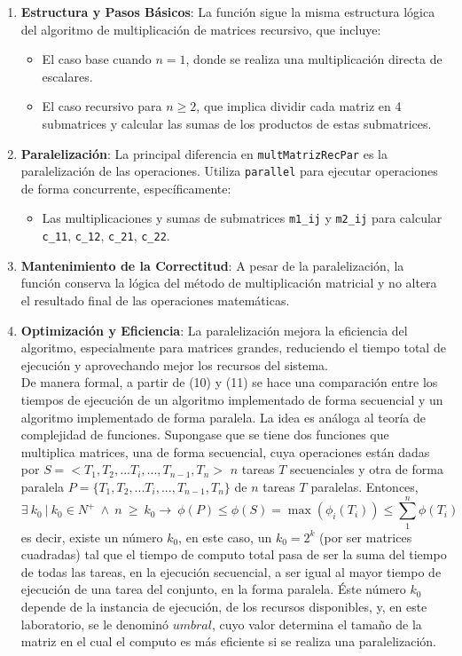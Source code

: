 \documentclass[12pt, a4paper]{article}
\begin{document}
\begin{enumerate}
    \item \textbf{Estructura y Pasos Básicos}: La función sigue la misma estructura lógica del algoritmo de multiplicación de matrices recursivo, que incluye:
    \begin{itemize}
        \item El caso base cuando $n = 1$, donde se realiza una multiplicación directa de escalares.
        \item El caso recursivo para $n \geq 2$, que implica dividir cada matriz en 4 submatrices y calcular las sumas de los productos de estas submatrices.
    \end{itemize}
    
    \item \textbf{Paralelización}: La principal diferencia en \texttt{multMatrizRecPar} es la paralelización de las operaciones. Utiliza \texttt{parallel} para ejecutar operaciones de forma concurrente, específicamente:
    \begin{itemize}
        \item Las multiplicaciones y sumas de submatrices \texttt{m1\_ij} y \texttt{m2\_ij} para calcular \texttt{c\_11}, \texttt{c\_12}, \texttt{c\_21}, \texttt{c\_22}.
    \end{itemize}

    \item \textbf{Mantenimiento de la Correctitud}: A pesar de la paralelización, la función conserva la lógica del método de multiplicación matricial y no altera el resultado final de las operaciones matemáticas.

    \item \textbf{Optimización y Eficiencia}: La paralelización mejora la eficiencia del algoritmo, especialmente para matrices grandes, reduciendo el tiempo total de ejecución y aprovechando mejor los recursos del sistema.
    \\ De manera formal, a partir de (10) y (11) se hace una comparación entre los tiempos de ejecución de un algoritmo implementado de forma secuencial y un algoritmo implementado de forma paralela.
     La idea es análoga al teoría de complejidad de funciones. Supongase que se tiene dos funciones que multiplica matrices, una de forma secuencial, cuya operaciones están dadas por 
     $S=<T_1,T_2,...T_i,...,T_{n-1},T_{n}>$ $n$ tareas $T$ secuenciales y otra de forma paralela $P=\{T_1,T_2,...T_i,...,T_{n-1},T_{n}\}$  de $n$ tareas $T$ paralelas. Entonces, 
    \[
     \exists~k_0~|~k_0 \in N^+~\land~n~\geq~k_0 \rightarrow ~\phi(P) \leq \phi(S) = \max (\phi_i(T_i)) \leq \sum_{1}^{n}\phi(T_i)   
    \]
    es decir, existe un número $k_0$, en este caso, un $k_0 = 2^k$ (por ser matrices cuadradas) tal que el tiempo de computo total pasa de ser la suma del tiempo de todas las tareas, en la ejecución secuencial, a
    ser igual al mayor tiempo de ejecución de una tarea del conjunto, en la forma paralela. Éste número $k_0$ depende de la instancia de ejecución, de los recursos disponibles, y, en este laboratorio, se le denominó
    $umbral$, cuyo valor determina el tamaño de la matriz en el cual el computo es más eficiente si se realiza una paralelización.
\end{enumerate}
\end{document}
